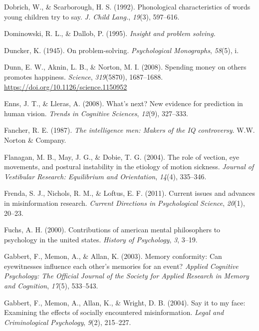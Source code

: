 \documentclass[
]{krantz}
\newlength{\cslhangindent}
\newenvironment{CSLReferences}[2] %
 {\begin{list}{}{%
  \setlength{\itemindent}{0pt}
  \setlength{\leftmargin}{0pt}
  \setlength{\parsep}{0pt}
  \ifodd #1
   \setlength{\leftmargin}{\cslhangindent}
   \setlength{\itemindent}{-1\cslhangindent}
  \fi
  \setlength{\itemsep}{#2\baselineskip}}}
 {\end{list}}
\begin{document}
\begin{CSLReferences}{1}{0}
Dobrich, W., \& Scarborough, H. S. (1992). Phonological characteristics of words young children try to say. \emph{J. Child Lang.}, \emph{19}(3), 597--616.

Dominowski, R. L., \& Dallob, P. (1995). \emph{Insight and problem solving.}

Duncker, K. (1945). On problem-solving. \emph{Psychological Monographs}, \emph{58}(5), i.

Dunn, E. W., Aknin, L. B., \& Norton, M. I. (2008). Spending money on others promotes happiness. \emph{Science}, \emph{319}(5870), 1687--1688. \url{https://doi.org/10.1126/science.1150952}

Enns, J. T., \& Lleras, A. (2008). What's next? New evidence for prediction in human vision. \emph{Trends in Cognitive Sciences}, \emph{12}(9), 327--333.

Fancher, R. E. (1987). \emph{The intelligence men: Makers of the IQ controversy}. W.W. Norton \& Company.

Flanagan, M. B., May, J. G., \& Dobie, T. G. (2004). The role of vection, eye movements, and postural instability in the etiology of motion sickness. \emph{Journal of Vestibular Research: Equilibrium and Orientation}, \emph{14}(4), 335--346.

Frenda, S. J., Nichols, R. M., \& Loftus, E. F. (2011). Current issues and advances in misinformation research. \emph{Current Directions in Psychological Science}, \emph{20}(1), 20--23.

Fuchs, A. H. (2000). Contributions of american mental philosophers to psychology in the united states. \emph{History of Psychology}, \emph{3}, 3--19.

Gabbert, F., Memon, A., \& Allan, K. (2003). Memory conformity: Can eyewitnesses influence each other's memories for an event? \emph{Applied Cognitive Psychology: The Official Journal of the Society for Applied Research in Memory and Cognition}, \emph{17}(5), 533--543.

Gabbert, F., Memon, A., Allan, K., \& Wright, D. B. (2004). Say it to my face: Examining the effects of socially encountered misinformation. \emph{Legal and Criminological Psychology}, \emph{9}(2), 215--227.


\end{CSLReferences}
\end{document}
